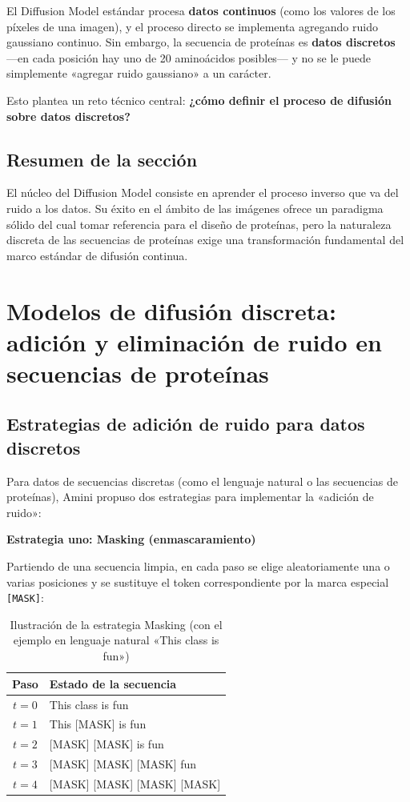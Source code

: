 \documentclass[a4paper]{article}
\begin{document}
El Diffusion Model estándar procesa \textbf{datos continuos} (como los valores de los píxeles de una imagen), y el proceso directo se implementa agregando ruido gaussiano continuo. Sin embargo, la secuencia de proteínas es \textbf{datos discretos} —en cada posición hay uno de 20 aminoácidos posibles— y no se le puede simplemente «agregar ruido gaussiano» a un carácter.

Esto plantea un reto técnico central: \textbf{¿cómo definir el proceso de difusión sobre datos discretos?}

\subsection{Resumen de la sección}

El núcleo del Diffusion Model consiste en aprender el proceso inverso que va del ruido a los datos. Su éxito en el ámbito de las imágenes ofrece un paradigma sólido del cual tomar referencia para el diseño de proteínas, pero la naturaleza discreta de las secuencias de proteínas exige una transformación fundamental del marco estándar de difusión continua.

\section{Modelos de difusión discreta: adición y eliminación de ruido en secuencias de proteínas}

\subsection{Estrategias de adición de ruido para datos discretos}

Para datos de secuencias discretas (como el lenguaje natural o las secuencias de proteínas), Amini propuso dos estrategias para implementar la «adición de ruido»:

\textbf{Estrategia uno: Masking (enmascaramiento)}

Partiendo de una secuencia limpia, en cada paso se elige aleatoriamente una o varias posiciones y se sustituye el token correspondiente por la marca especial \texttt{[MASK]}:

\begin{table}[H]
\centering
\caption{Ilustración de la estrategia Masking (con el ejemplo en lenguaje natural «This class is fun»)}
\begin{tabular}{@{}cl@{}}
\toprule
\textbf{Paso} & \textbf{Estado de la secuencia} \\
\midrule
$t=0$ & This class is fun \\
$t=1$ & This {[}MASK{]} is fun \\
$t=2$ & {[}MASK{]} {[}MASK{]} is fun \\
$t=3$ & {[}MASK{]} {[}MASK{]} {[}MASK{]} fun \\
$t=4$ & {[}MASK{]} {[}MASK{]} {[}MASK{]} {[}MASK{]} \\
\bottomrule
\end{tabular}
\end{table}
\end{document}
